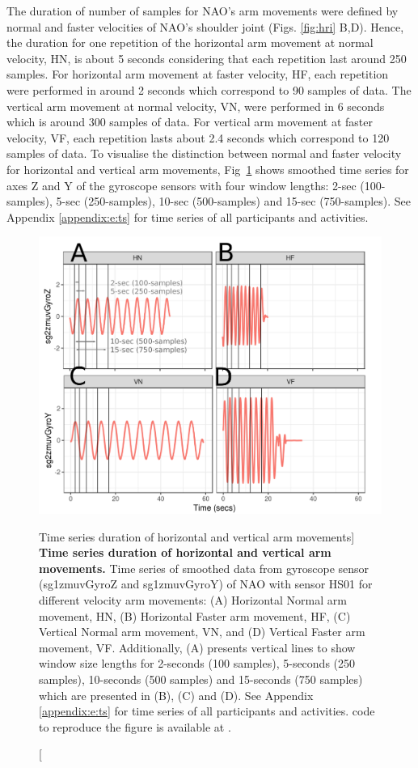The duration of number of samples for NAO's arm movements were defined by 
normal and faster velocities of NAO's shoulder joint (Figs. \ref{fig:hri} B,D). 
Hence, the duration for one repetition of the horizontal 
arm movement at normal velocity, HN, is about 5 seconds considering that 
each repetition last around 250 samples. For horizontal arm movement at 
faster velocity, HF, each repetition were performed in around 2 seconds 
which correspond to 90 samples of data. 
The vertical arm movement at normal velocity, VN, were performed  in 6 seconds 
which is around 300 samples of data.
For vertical arm movement at faster velocity, VF, each repetition lasts 
about 2.4 seconds which correspond to 120 samples of data.
To visualise the distinction between normal and faster velocity for horizontal 
and vertical arm movements, Fig~\ref{fig:sts} shows smoothed time series 
for axes Z and Y of the gyroscope sensors with four window lengths: 
2-sec (100-samples), 5-sec (250-samples), 10-sec (500-samples) 
and 15-sec (750-samples).
See Appendix \ref{appendix:e:ts} for 
time series of all participants and activities. 
\begin{figure}
  \centering
  \includegraphics[width=1.0\textwidth]{fig_4_04}
    \caption
	[Time series duration of horizontal and vertical arm movements]{
	{\bf Time series duration of horizontal and vertical arm movements.} 
		Time series of smoothed data from gyroscope sensor 
		(sg1zmuvGyroZ and sg1zmuvGyroY) of NAO 
		with sensor HS01 for different velocity arm movements: 
		(A) Horizontal Normal arm movement, HN, 
		(B) Horizontal Faster arm movement, HF,
		(C) Vertical Normal arm movement, VN, and 
		(D) Vertical Faster arm movement, VF.
		Additionally, (A) presents vertical lines 
		to show window size lengths for 2-seconds 
		(100 samples), 5-seconds (250 samples), 
		10-seconds (500 samples) and 15-seconds (750 samples)
		which are presented in (B), (C) and (D).
		See Appendix \ref{appendix:e:ts} for 
		time series of all participants and activities. 
	\R code to reproduce the figure is available at 
	.
        }
	\label{fig:sts}
\end{figure}
